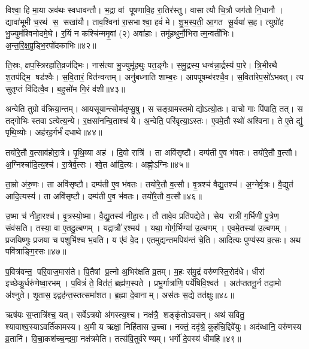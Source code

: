 विश्वा॒ हि मा॒या अव॑थः स्वधावन्तौ। 
भ॒द्रा वां पूषणावि॒ह रा॒तिर॑स्तु। वासात्यौ चि॒त्रौ जग॑तो नि॒धानौ। 
द्यावा॑भूमी च॒रथ॑ स॒ सखा॑यौ। ताव॒श्विना॑ रा॒सभाश्वा॒ हवं॑ मे। 
शु॒भ॒स्प॒ती॒ आ॒गत सू॒र्यया॑ स॒ह। त्युग्रो॑ह भु॒ज्युम॑श्विनोदमे॒घे। 
र॒यिं न कश्चि॑न्ममृ॒वां (२) अवा॑हाः। तमू॑हथुर्नौ॒भिरात्म॒न्वती॑भिः। 
अ॒न्त॒रि॒क्ष॒प्रुड्भि॒रपो॑दकाभिः॥४२॥


ति॒स्रः, क्षप॒स्त्रिरहा॑ति॒व्रज॑द्भिः। नास॑त्या भु॒ज्युमू॑हथुः पत॒ङ्गैः। 
स॒मु॒द्रस्य॒ धन्व॑न्ना॒र्द्रस्य॑ पा॒रे। त्रि॒भीरथै श॒तप॑द्भि॒ षड॑श्वैः। 
स॒वि॒तारं॒ वित॑न्वन्तम्‌। अनु॑बध्नाति शाम्ब॒रः। आपपू\ur{}षम्ब॑रश्चै॒व। 
स॒विता॑रेप॒सो॑ऽभवत्‌। त्य सुतृप्तं वि॑दित्वै॒व। ब॒हुसो॑म गि॒रं व॑शी॥४३॥

अन्वेति तुग्रो व॑क्रिया॒न्तम्‌। आयसूयान्त्सोम॑तृप्सु॒षु। स \linebreak सङ्ग्रामस्तमोद्योऽत्यो॒तः। 
वाचो गाः पि॑पाति॒ तत्‌। स तद्गोभिः स्तवाऽत्येत्य॒न्ये। र॒क्षसा॑नन्वि॒ताश्च॑ ये। 
अ॒न्वेति॒ परि॑वृत्या॒ऽस्तः। ए॒वमे॒तौ स्थो॑ अश्विना। 
ते ए॒ते द्यु॑ पृथि॒व्योः। अह॑रह॒र्गर्भं॑ दधाथे॥४४॥

तयो॑रे॒तौ व॒त्साव॑होरा॒त्रे। पृ॒थि॒व्या अह॑। दि॒वो रात्रि॑। 
ता अवि॑सृष्टौ। दम्प॑ती ए॒व भ॑वतः। तयो॑रे॒तौ व॒त्सौ। 
अ॒ग्निश्चा॑दि॒त्य॒श्च॑। रा॒त्रेर्व॒त्सः। श्वे॒त आ॑दि॒त्यः। अह्नो॒ऽग्निः॥४५॥

ता॒म्रो अ॑रु॒णः। ता अवि॑सृष्टौ। दम्प॑ती ए॒व भ॑वतः। 
तयो॑रे॒तौ व॒त्सौ। वृ॒त्रश्च॑ वैद्यु॒तश्च॑। अ॒ग्नेर्वृ॒त्रः। वै॒द्युत॑ आदि॒त्यस्य॑। 
ता अवि॑सृष्टौ। दम्प॑ती ए॒व भ॑वतः। तयो॑रे॒तौ व॒त्सौ॥४६॥


उ॒ष्मा च॑ नीहा॒रश्च॑। वृ॒त्रस्यो॒ष्मा। वै॒द्यु॒तस्य॑ नीहा॒रः। 
तौ तावे॒व प्रति॑पद्येते। सेय रात्री॑ ग॒र्भिणी॑ पु॒त्रेण॒ संव॑सति। 
तस्या॒ वा ए॒तदु॒ल्बणम्‌। यद्रात्रौ॑ र॒श्मय॑। 
यथा॒ गोर्ग॒र्भिण्या॑ उ॒ल्बणम्‌। ए॒वमे॒तस्या॑ उ॒ल्बणम्‌। 
प्रजयिष्णुः प्रजया च पशुभि॑श्च भ॒वति। 
य ए॑वं वे॒द। एतमुद्यन्तमपिय॑न्तं चे॒ति। 
आदित्यः पुण्य॑स्य व॒त्सः। अथ पवि॑त्राङ्गि॒रसः॥४७॥\anuvakamend


प॒वित्र॑वन्त॒ परि॒वाज॒मास॑ते। पि॒तैषां प्र॒त्नो अ॒भिर॑क्षति व्र॒तम्‌। 
म॒हः स॑मु॒द्रं वरु॑णस्ति॒रोद॑धे। धीरा॑ इच्छेकु॒र्धरु॑णेष्वा॒रभम्‌। 
प॒वित्रं॑ ते॒ वित॑तं॒ ब्रह्म॑ण॒स्पते। प्रभु॒र्गात्रा॑णि॒ पर्ये॑षिवि॒श्वत॑। 
अत॑प्ततनू॒र्न तदा॒मो अ॑श्नुते। शृ॒तास॒ इद्वह॑न्त॒स्तत्समा॑शत। 
ब्र॒ह्मा दे॒वानाम्‌। अस॑तः स॒द्ये तत॑क्षुः॥४८॥


ऋष॑यः स॒प्तात्रि॑श्च॒ यत्‌। सर्वेऽत्रयो अ॑गस्त्य॒श्च। 
नक्ष॑त्रै॒ शङ्कृ॑तोऽवसन्‌। अथ॑ सवितु॒ श्यावाश्व॒स्याऽवर्ति॑कामस्य। 
अ॒मी य ऋक्षा॒ निहि॑तास उ॒च्चा। नक्तं॒ ददृ॑श्रे॒ कुह॑चि॒द्दिवे॑युः। 
अद॑ब्धानि॒ वरु॑णस्य व्र॒तानि॑। वि॒चा॒कश॑च्च॒न्द्रमा॒ नक्ष॑त्रमेति। 
तत्स॑वि॒तुर्वरेण्यम्। भर्गो॑ दे॒वस्य॑ धीमहि॥४९॥


